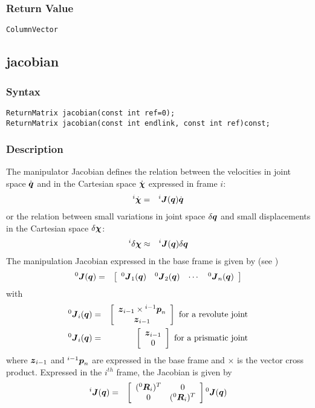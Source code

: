 \documentclass[dvips,11pt,fleqn]{report}
\newcommand{\mbold}[1]{\mbox{\boldmath $ #1 $}}
\newcommand{\matr}[2]{\left[\begin{array}{#1} #2 \end{array}\right]}
\begin{document}
\subsubsection*{Return Value}

{\tt ColumnVector}

\newpage

\subsection*{jacobian}
\subsubsection*{Syntax}
\begin{verbatim}
ReturnMatrix jacobian(const int ref=0);
ReturnMatrix jacobian(const int endlink, const int ref)const;
\end{verbatim}
\subsubsection*{Description}
The manipulator Jacobian defines the relation between the velocities in joint space 
$\dot{\mbold{q}}$ and in the Cartesian space $\dot{\mbold{\chi}}$ expressed in frame $i$:
\begin{eqnarray}
{}^i \dot{\mbold{\chi}} & = & {}^i \mbold{J}(\mbold{q}) \dot{\mbold{q}}
\end{eqnarray}
or the relation between small variations in joint space 
$\delta \mbold{q}$ and small displacements in the Cartesian space $\delta \mbold{\chi}$:
\begin{eqnarray}
{}^i \delta \mbold{\chi} & \approx & {}^i \mbold{J}(\mbold{q}) \delta \mbold{q}
\end{eqnarray}
The manipulation Jacobian expressed in the base frame is given by 
(see \cite{Fu87})
\begin{eqnarray}
{}^0 \mbold{J}(\mbold{q}) & = & \matr{cccc}{
{}^0 \mbold{J}_1(\mbold{q}) & {}^0 \mbold{J}_2(\mbold{q}) & \cdots & {}^0 \mbold{J}_n(\mbold{q})}
\end{eqnarray}
with
\begin{eqnarray}
  {}^0 \mbold{J}_i(\mbold{q}) & = & 
  \matr{c}{ \mbold{z}_{i-1} \times {}^{i-1} \mbold{p}_n \\ \mbold{z}_{i-1}} 
  \mbox{ for a revolute joint} \\
  {}^0 \mbold{J}_i(\mbold{q}) & = & 
  \matr{c}{ \mbold{z}_{i-1} \\ 0} \mbox{ for a prismatic joint} 
\end{eqnarray}
where $\mbold{z}_{i-1}$ and ${}^{i-1} \mbold{p}_n$ are expressed in
the base frame and $\times$ is the vector cross product.  Expressed in
the $i^{th}$ frame, the Jacobian is given by
\begin{eqnarray}
{}^i \mbold{J}(\mbold{q}) & = &
\matr{cc}{
({}^0 \mbold{R}_i)^T & 0 \\ 0 & ({}^0 \mbold{R}_i)^T 
} {}^0 \mbold{J}(\mbold{q})
\end{eqnarray}
\end{document}
